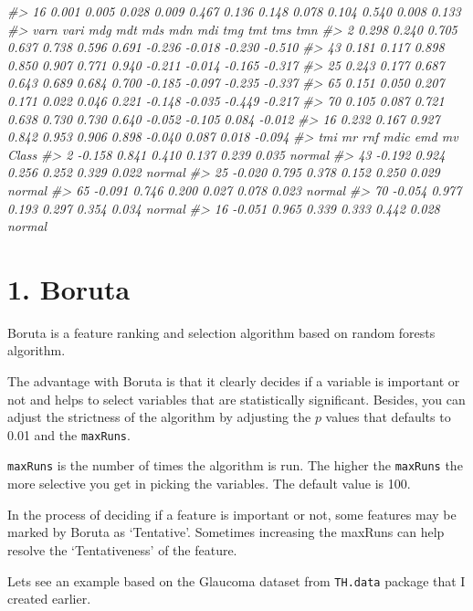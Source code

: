 \documentclass[]{book}
\newenvironment{Shaded}{\begin{snugshade}}{\end{snugshade}}
\newcommand{\CommentTok}[1]{\textcolor[rgb]{0.56,0.35,0.01}{\textit{#1}}}
\begin{document}
\begin{Shaded}
\begin{Highlighting}[]
\CommentTok{#> 16 0.001 0.005 0.028 0.009 0.467 0.136 0.148 0.078 0.104 0.540 0.008 0.133}
\CommentTok{#>     varn  vari   mdg   mdt   mds   mdn   mdi    tmg    tmt    tms    tmn}
\CommentTok{#> 2  0.298 0.240 0.705 0.637 0.738 0.596 0.691 -0.236 -0.018 -0.230 -0.510}
\CommentTok{#> 43 0.181 0.117 0.898 0.850 0.907 0.771 0.940 -0.211 -0.014 -0.165 -0.317}
\CommentTok{#> 25 0.243 0.177 0.687 0.643 0.689 0.684 0.700 -0.185 -0.097 -0.235 -0.337}
\CommentTok{#> 65 0.151 0.050 0.207 0.171 0.022 0.046 0.221 -0.148 -0.035 -0.449 -0.217}
\CommentTok{#> 70 0.105 0.087 0.721 0.638 0.730 0.730 0.640 -0.052 -0.105  0.084 -0.012}
\CommentTok{#> 16 0.232 0.167 0.927 0.842 0.953 0.906 0.898 -0.040  0.087  0.018 -0.094}
\CommentTok{#>       tmi    mr   rnf  mdic   emd    mv  Class}
\CommentTok{#> 2  -0.158 0.841 0.410 0.137 0.239 0.035 normal}
\CommentTok{#> 43 -0.192 0.924 0.256 0.252 0.329 0.022 normal}
\CommentTok{#> 25 -0.020 0.795 0.378 0.152 0.250 0.029 normal}
\CommentTok{#> 65 -0.091 0.746 0.200 0.027 0.078 0.023 normal}
\CommentTok{#> 70 -0.054 0.977 0.193 0.297 0.354 0.034 normal}
\CommentTok{#> 16 -0.051 0.965 0.339 0.333 0.442 0.028 normal}
\end{Highlighting}
\end{Shaded}

\hypertarget{boruta}{%
\section{1. Boruta}\label{boruta}}

Boruta is a feature ranking and selection algorithm based on random forests algorithm.

The advantage with Boruta is that it clearly decides if a variable is important or not and helps to select variables that are statistically significant. Besides, you can adjust the strictness of the algorithm by adjusting the \(p\) values that defaults to 0.01 and the \texttt{maxRuns}.

\texttt{maxRuns} is the number of times the algorithm is run. The higher the \texttt{maxRuns} the more selective you get in picking the variables. The default value is 100.

In the process of deciding if a feature is important or not, some features may be marked by Boruta as `Tentative'. Sometimes increasing the maxRuns can help resolve the `Tentativeness' of the feature.

Lets see an example based on the Glaucoma dataset from \texttt{TH.data} package that I created earlier.
\end{document}
